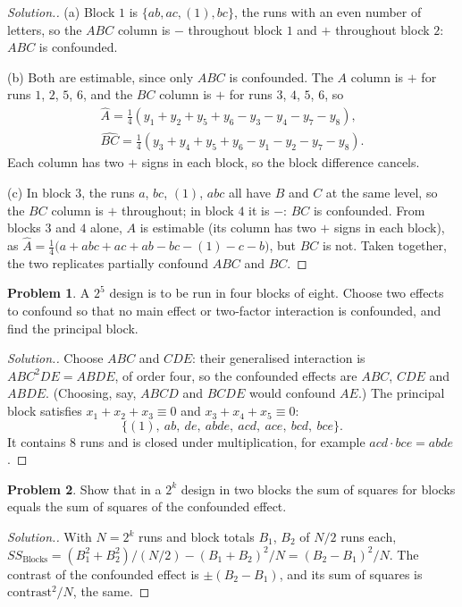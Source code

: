 \documentclass[11pt,a4paper]{article}
\numberwithin{equation}{section}
\theoremstyle{definition}
\newtheorem{problemx}{Problem}[subsection]
\newenvironment{problem}{\begin{problemx}}{\end{problemx}}
\newenvironment{solution}
  {\renewcommand{\qedsymbol}{}\begin{proof}[\textit{Solution}.]}
  {\end{proof}}
\begin{document}
\begin{solution}
(a) Block $1$ is $\{ab, ac, (1), bc\}$, the runs with an even number of letters, so the $ABC$ column is $-$ throughout block $1$ and $+$ throughout block $2$: $ABC$
is confounded.

(b) Both are estimable, since only $ABC$ is confounded. The $A$ column is $+$ for runs $1$, $2$, $5$, $6$, and the $BC$ column is $+$ for runs $3$, $4$, $5$, $6$, so
\begin{gather*}
\hat A = \tfrac14(y_1 + y_2 + y_5 + y_6 - y_3 - y_4 - y_7 - y_8) , \\
\widehat{BC} = \tfrac14(y_3 + y_4 + y_5 + y_6 - y_1 - y_2 - y_7 - y_8) .
\end{gather*}
Each column has two $+$ signs in each block, so the block difference cancels.

(c) In block $3$, the runs $a$, $bc$, $(1)$, $abc$ all have $B$ and $C$ at the same level, so the $BC$ column is $+$ throughout; in block $4$ it is $-$: $BC$ is confounded.
From blocks $3$ and $4$ alone, $A$ is estimable (its column has two $+$ signs in each block), as $\hat A = \frac14\bigl(a + abc + ac + ab - bc - (1) - c - b\bigr)$, but $BC$ is not.
Taken together, the two replicates partially confound $ABC$ and $BC$.
\end{solution}

\begin{problem}
A $2^5$ design is to be run in four blocks of eight. Choose two effects to confound so that no main effect or two-factor interaction is confounded,
and find the principal block.
\end{problem}

\begin{solution}
Choose $ABC$ and $CDE$: their generalised interaction is $ABC^2DE = ABDE$, of order four, so the confounded effects are $ABC$, $CDE$ and $ABDE$. (Choosing,
say, $ABCD$ and $BCDE$ would confound $AE$.) The principal block satisfies $x_1 + x_2 + x_3 \equiv 0$ and $x_3 + x_4 + x_5 \equiv 0$:
\[
\{(1),\ ab,\ de,\ abde,\ acd,\ ace,\ bcd,\ bce\} .
\]
It contains $8$ runs and is closed under multiplication, for example $acd \cdot bce = abde$.
\end{solution}

\begin{problem}
Show that in a $2^k$ design in two blocks the sum of squares for blocks equals the sum of squares of the confounded effect.
\end{problem}

\begin{solution}
With $N = 2^k$ runs and block totals $B_1$, $B_2$ of $N/2$ runs each, $SS_{\mathrm{Blocks}} = (B_1^2 + B_2^2)/(N/2) - (B_1 + B_2)^2/N = (B_2 - B_1)^2/N$. The contrast of the
confounded effect is $\pm(B_2 - B_1)$, and its sum of squares is $\text{contrast}^2/N$, the same.
\end{solution}
\end{document}
